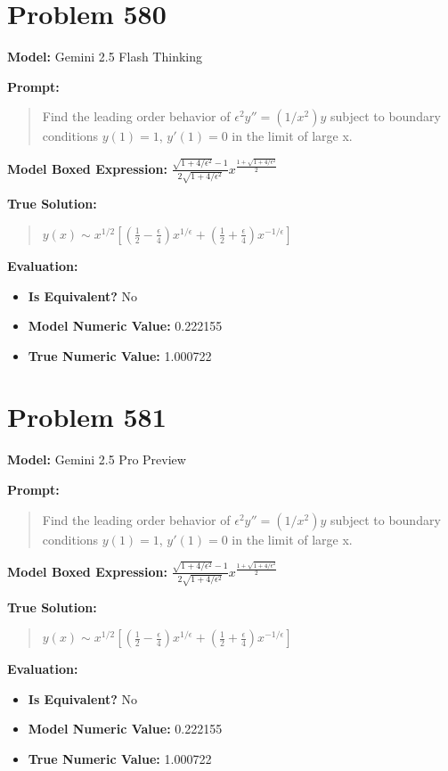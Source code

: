 \documentclass{article}
\begin{document}
\section*{Problem 580}
\textbf{Model:} Gemini 2.5 Flash Thinking

\textbf{Prompt:}
\begin{quote}
Find the leading order behavior of $\epsilon^2 y'' = (1/x^2) y$ subject to boundary conditions $y(1) = 1$, $y'(1)= 0$ in the limit of large x.
\end{quote}
\textbf{Model Boxed Expression:} $\frac{\sqrt{1 + 4/\epsilon^2} - 1}{2\sqrt{1 + 4/\epsilon^2}} x^{\frac{1 + \sqrt{1 + 4/\epsilon^2}}{2}}$

\textbf{True Solution:}
\begin{quote}
$y(x) \sim x^{1/2}[(\frac{1}{2}-\frac{\epsilon}{4})x^{1/\epsilon}+(\frac{1}{2}+\frac{\epsilon}{4})x^{-1/\epsilon}]$
\end{quote}

\textbf{Evaluation:}
\begin{itemize}
\item \textbf{Is Equivalent?} No
\item \textbf{Model Numeric Value:} 0.222155
\item \textbf{True Numeric Value:} 1.000722
\end{itemize}
\vspace{1cm}
\section*{Problem 581}
\textbf{Model:} Gemini 2.5 Pro Preview

\textbf{Prompt:}
\begin{quote}
Find the leading order behavior of $\epsilon^2 y'' = (1/x^2) y$ subject to boundary conditions $y(1) = 1$, $y'(1)= 0$ in the limit of large x.
\end{quote}
\textbf{Model Boxed Expression:} $\frac{\sqrt{1+4/\epsilon^2}-1}{2\sqrt{1+4/\epsilon^2}} x^{\frac{1 + \sqrt{1 + 4/\epsilon^2}}{2}}$

\textbf{True Solution:}
\begin{quote}
$y(x) \sim x^{1/2}[(\frac{1}{2}-\frac{\epsilon}{4})x^{1/\epsilon}+(\frac{1}{2}+\frac{\epsilon}{4})x^{-1/\epsilon}]$
\end{quote}

\textbf{Evaluation:}
\begin{itemize}
\item \textbf{Is Equivalent?} No
\item \textbf{Model Numeric Value:} 0.222155
\item \textbf{True Numeric Value:} 1.000722
\end{itemize}
\vspace{1cm}
\end{document}
